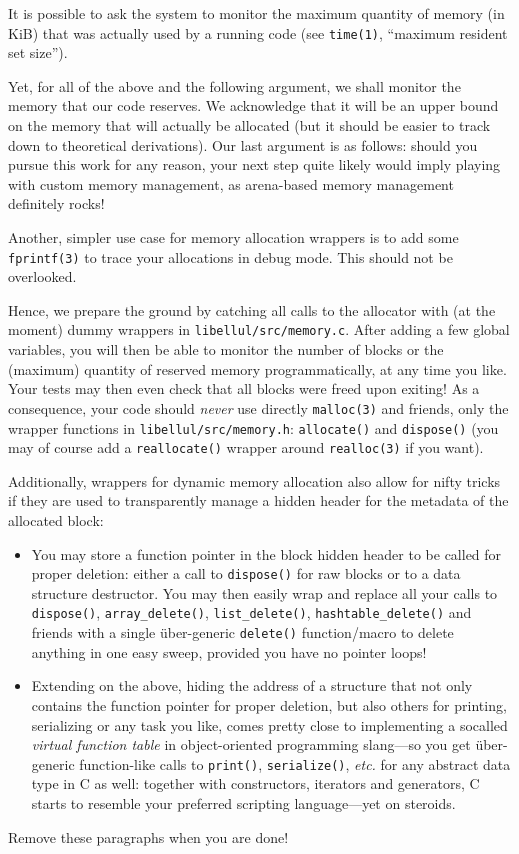 It is possible to ask the system to monitor the maximum quantity of memory (in KiB) that was actually used by a running code (see \texttt{time(1)}, ``maximum resident set size'').

Yet, for all of the above and the following argument, we shall monitor the memory that our code reserves. We acknowledge that it will be an upper bound on the memory that will actually be allocated (but it should be easier to track down to theoretical derivations). Our last argument is as follows: should you pursue this work for any reason, your next step quite likely would imply playing with custom memory management, as arena-based memory management definitely rocks!

Another, simpler use case for memory allocation wrappers is to add some \texttt{fprintf(3)} to trace your allocations in debug mode. This should not be overlooked.

Hence, we prepare the ground by catching all calls to the allocator with (at the moment) dummy wrappers in \texttt{libellul/src/memory.c}. After adding a few global variables, you will then be able to monitor the number of blocks or the (maximum) quantity of reserved memory programmatically, at any time you like. Your tests may then even check that all blocks were freed upon exiting! As a consequence, your code should \textit{never} use directly \texttt{malloc(3)} and friends, only the wrapper functions in \texttt{libellul/src/memory.h}: \texttt{allocate()} and \texttt{dispose()} (you may of course add a \texttt{reallocate()} wrapper around \texttt{realloc(3)} if you want). 

Additionally, wrappers for dynamic memory allocation also allow for nifty tricks if they are used to transparently manage a hidden header for the metadata of the allocated block:
\begin{itemize}
\item You may store a function pointer in the block hidden header to be called for proper deletion: either a call to \texttt{dispose()} for raw blocks or to a data structure destructor. You may then easily wrap and replace all your calls to \texttt{dispose()}, \texttt{array\_delete()}, \texttt{list\_delete()}, \texttt{hashtable\_delete()} and friends with a single über-generic \texttt{delete()} function/macro to delete anything in one easy sweep, provided you have no pointer loops!
\item Extending on the above, hiding the address of a structure that not only contains the function pointer for proper deletion, but also others for printing, serializing or any task you like, comes pretty close to implementing a socalled \textit{virtual function table} in object-oriented programming slang---so you get über-generic function-like calls to \texttt{print()}, \texttt{serialize()}, \textit{etc.} for any abstract data type in C as well: together with constructors, iterators and generators, C starts to resemble your preferred scripting language---yet on steroids.
\end{itemize}

Remove these paragraphs when you are done!

